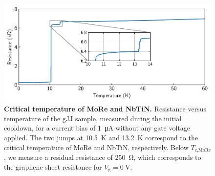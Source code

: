 \begin{figure}[]
	\centering
	\includegraphics[width=.7\linewidth]{chapter-gJJ/figs/si_cooldown_tc}
	\caption{{\bf Critical temperature of MoRe and NbTiN.}
		Resistance versus temperature of the gJJ sample, measured during the initial cooldown, for a current bias of \SI{1}{\micro\ampere} without any gate voltage applied.
		The two jumps at \SI{10.5}{\kelvin} and \SI{13.2}{\kelvin} correspond to the critical temperature of MoRe and NbTiN, respectively.
		Below $T_\text{c,MoRe}$, we measure a residual resistance of \SI{250}{\ohm}, which corresponds to the graphene sheet resistance for $V_\text{g}=\SI{0}{\volt}$.}
	\label{gJJfig:critical_temp}
\end{figure}


